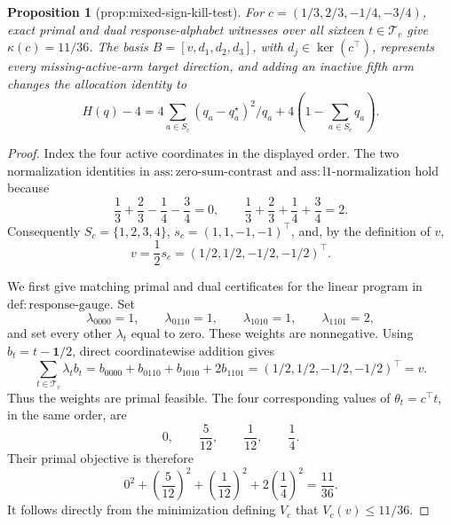 \documentclass{article}
\newtheorem{proposition}{Proposition}
\begin{document}
\begin{proposition}[prop:mixed-sign-kill-test]\label{prop:mixed-sign-kill-test}
For \(c=(1/3,2/3,-1/4,-3/4)\), exact primal and dual response-alphabet witnesses over all sixteen \(t\in\mathcal T_c\) give \(\kappa(c)=11/36\). The basis \(B=[v,d_1,d_2,d_3]\), with \(d_j\in\ker(c^\top)\), represents every missing-active-arm target direction, and adding an inactive fifth arm changes the allocation identity to \[H(q)-4=4\sum_{a\in S_c}(q_a-q_a^\star)^2/q_a+4\left(1-\sum_{a\in S_c}q_a\right).\]
\end{proposition}
\begin{proof}
Index the four active coordinates in the displayed order.  The two normalization identities in \(\mathrm{ass:zero\text{-}sum\text{-}contrast}\) and \(\mathrm{ass:l1\text{-}normalization}\) hold because
\[
 \frac13+\frac23-\frac14-\frac34=0,
 \qquad
 \frac13+\frac23+\frac14+\frac34=2.
\]
Consequently \(S_c=\{1,2,3,4\}\), \(s_c=(1,1,-1,-1)^\top\), and, by the definition of \(v\),
\[
 v=\frac12s_c=(1/2,1/2,-1/2,-1/2)^\top.
\]

We first give matching primal and dual certificates for the linear program in \(\mathrm{def:response\text{-}gauge}\).  Set
\[
 \lambda_{0000}=1,\qquad
 \lambda_{0110}=1,\qquad
 \lambda_{1010}=1,\qquad
 \lambda_{1101}=2,
\]
and set every other \(\lambda_t\) equal to zero.  These weights are nonnegative.  Using \(b_t=t-\mathbf 1/2\), direct coordinatewise addition gives
\[
 \sum_{t\in\mathcal T_c}\lambda_t b_t
 =b_{0000}+b_{0110}+b_{1010}+2b_{1101}
 =(1/2,1/2,-1/2,-1/2)^\top=v.
\]
Thus the weights are primal feasible.  The four corresponding values of \(\theta_t=c^\top t\), in the same order, are
\[
 0,\qquad \frac{5}{12},\qquad \frac{1}{12},\qquad \frac14.
\]
Their primal objective is therefore
\[
 0^2+\left(\frac{5}{12}\right)^2
 +\left(\frac{1}{12}\right)^2
 +2\left(\frac14\right)^2
 =\frac{11}{36}.
\]
It follows directly from the minimization defining \(V_c\) that \(V_c(v)\le 11/36\).


\end{proof}
\end{document}
